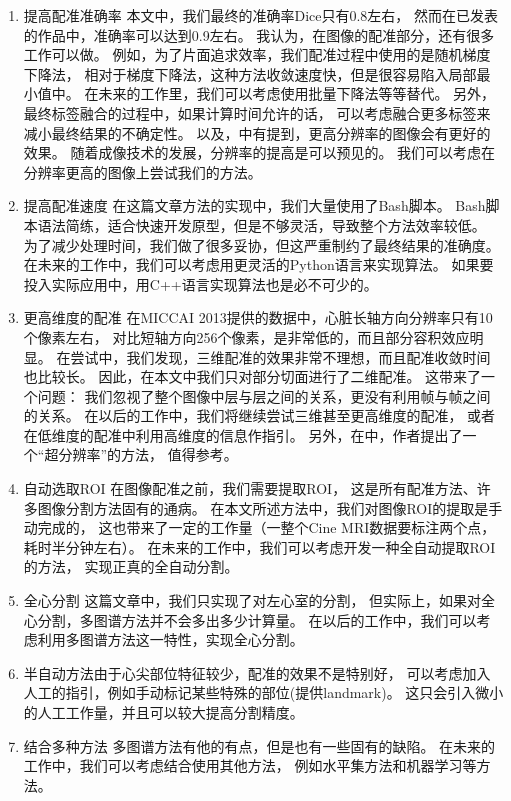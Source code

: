 \begin{enumerate}
  \item{提高配准准确率}
    本文中，我们最终的准确率Dice只有0.8左右，
    然而在已发表的作品中，准确率可以达到0.9左右。
    我认为，在图像的配准部分，还有很多工作可以做。
    例如，为了片面追求效率，我们配准过程中使用的是随机梯度下降法，
    相对于梯度下降法，这种方法收敛速度快，但是很容易陷入局部最小值中。
    在未来的工作里，我们可以考虑使用批量下降法等等替代。
    另外，最终标签融合的过程中，如果计算时间允许的话，
    可以考虑融合更多标签来减小最终结果的不确定性。
    以及，\cite{HigherResolution}中有提到，更高分辨率的图像会有更好的效果。
    随着成像技术的发展，分辨率的提高是可以预见的。
    我们可以考虑在分辨率更高的图像上尝试我们的方法。
  \item{提高配准速度}
    在这篇文章方法的实现中，我们大量使用了Bash脚本。
    Bash脚本语法简练，适合快速开发原型，但是不够灵活，导致整个方法效率较低。
    为了减少处理时间，我们做了很多妥协，但这严重制约了最终结果的准确度。
    在未来的工作中，我们可以考虑用更灵活的Python语言来实现算法。
    如果要投入实际应用中，用C++语言实现算法也是必不可少的。
  \item{更高维度的配准}
    在MICCAI 2013提供的数据中，心脏长轴方向分辨率只有10个像素左右，
    对比短轴方向256个像素，是非常低的，而且部分容积效应明显。
    在尝试中，我们发现，三维配准的效果非常不理想，而且配准收敛时间也比较长。
    因此，在本文中我们只对部分切面进行了二维配准。
    这带来了一个问题：
    我们忽视了整个图像中层与层之间的关系，更没有利用帧与帧之间的关系。
    在以后的工作中，我们将继续尝试三维甚至更高维度的配准，
    或者在低维度的配准中利用高维度的信息作指引。
    另外，在\cite{ShiSuperResolution2013}中，作者提出了一个``超分辨率''的方法，
    值得参考。
  \item{自动选取ROI}
    在图像配准之前，我们需要提取ROI，
    这是所有配准方法、许多图像分割方法固有的通病。
    在本文所述方法中，我们对图像ROI的提取是手动完成的，
    这也带来了一定的工作量（一整个Cine MRI数据要标注两个点，耗时半分钟左右）。
    在未来的工作中，我们可以考虑开发一种全自动提取ROI的方法，
    实现正真的全自动分割。
  \item{全心分割}
    这篇文章中，我们只实现了对左心室的分割，
    但实际上，如果对全心分割，多图谱方法并不会多出多少计算量。
    在以后的工作中，我们可以考虑利用多图谱方法这一特性，实现全心分割。
  \item{半自动方法}由于心尖部位特征较少，配准的效果不是特别好，
    可以考虑加入人工的指引，例如手动标记某些特殊的部位(提供landmark)。
    这只会引入微小的人工工作量，并且可以较大提高分割精度。
  \item{结合多种方法}
    多图谱方法有他的有点，但是也有一些固有的缺陷。
    在未来的工作中，我们可以考虑结合使用其他方法，
    例如水平集方法和机器学习等方法。
\end{enumerate}
